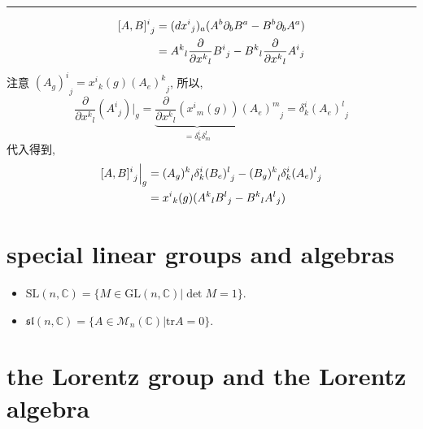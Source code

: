 \begin{itemize}
\begin{tcolorbox}[title=proof:]
		\noindent\rule[0.5ex]{\linewidth}{0.5pt} %
		
		\begin{align}
			{[A, B]^i}_j &= (d{x^i}_j)_a (A^b \partial_b B^a - B^b \partial_b A^a) \notag \\
			&= {A^k}_l \frac{\partial}{\partial {x^k}_l} {B^i}_j - {B^k}_l \frac{\partial}{\partial {x^k}_l} {A^i}_j
		\end{align}
		注意 ${(A_g)^i}_j = {x^i}_k(g) {(A_e)^k}_j$, 所以,
		\begin{equation}
			\frac{\partial}{\partial {x^k}_l} ({A^i}_j) \Big|_g = \underbrace{\frac{\partial}{\partial {x^k}_l} ({{x^i}_m}(g))}_{= \delta^i_k \delta^l_m} {(A_e)^m}_j = \delta^i_k {(A_e)^l}_j
		\end{equation}
		代入得到,
		\begin{align}
			{[A, B]^i}_j \Big|_g &= {(A_g)^k}_l \delta^i_k {(B_e)^l}_j - {(B_g)^k}_l \delta^i_k {(A_e)^l}_j \notag \\
			&= {x^i}_k(g) ({A^k}_l {B^l}_j - {B^k}_l {A^l}_j)
		\end{align}
	\end{tcolorbox}
\end{itemize}

\section{special linear groups and algebras}
\begin{itemize}
	\item $\mathrm{SL}(n, \mathbb{C}) = \{M \in \mathrm{GL}(n, \mathbb{C}) | \det M = 1\}$.
	
	\item $\mathfrak{sl}(n, \mathbb{C}) = \{A \in \mathcal{M}_n(\mathbb{C}) | \mathrm{tr} A = 0\}$.
\end{itemize}

\section{the Lorentz group and the Lorentz algebra}
